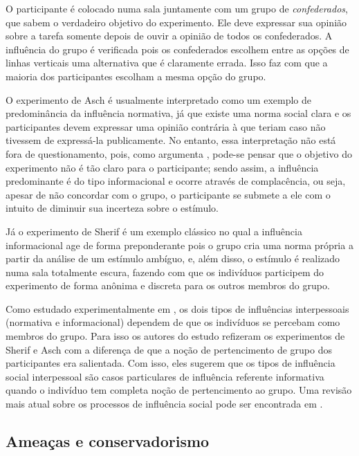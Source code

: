 O participante é colocado numa sala juntamente com um grupo de
\textit{confederados}, que sabem o verdadeiro objetivo do experimento.
Ele deve expressar sua opinião sobre a tarefa somente depois de ouvir a
opinião de todos os confederados. A influência do grupo é verificada
pois os confederados escolhem entre as opções de linhas verticais uma
alternativa que é claramente errada. Isso faz com que a maioria dos
participantes escolham a mesma opção do grupo.

O experimento de Asch é usualmente interpretado como um exemplo de
predominância da influência normativa, já que existe uma
norma social clara e os participantes devem expressar uma opinião contrária
à que teriam caso não tivessem de expressá-la publicamente. No entanto,
essa interpretação não está fora de questionamento, pois, como argumenta
\citep{Abrams1990}, pode-se pensar que o objetivo do experimento não é
tão claro para o participante; sendo assim, a influência predominante é
do tipo informacional e ocorre através de complacência, ou seja, apesar
de não concordar com o grupo, o participante se submete a ele com o intuito
de diminuir sua incerteza sobre o estímulo.

Já o experimento de Sherif é um exemplo clássico no qual a influência
informacional age de forma preponderante pois o grupo cria uma norma própria
a partir da análise de um estímulo ambíguo, e, além disso, o estímulo
é realizado numa sala totalmente escura, fazendo com que os indivíduos
participem do experimento de forma anônima e discreta para os outros membros
do grupo.

Como estudado experimentalmente em \citep{Abrams1990}, os dois tipos de
influências interpessoais (normativa e informacional) dependem de que
os indivíduos se percebam como membros do grupo. Para isso os autores do
estudo refizeram os experimentos de Sherif e Asch com a diferença de que
a noção de pertencimento de grupo dos participantes era salientada. Com
isso, eles sugerem que os tipos de influência social interpessoal são casos
particulares de influência referente informativa quando o indivíduo tem
completa noção de pertencimento ao grupo.  Uma revisão mais atual sobre
os processos de influência social pode ser encontrada em \citep{Cialdini2004}.


\subsection{Ameaças e conservadorismo} %


